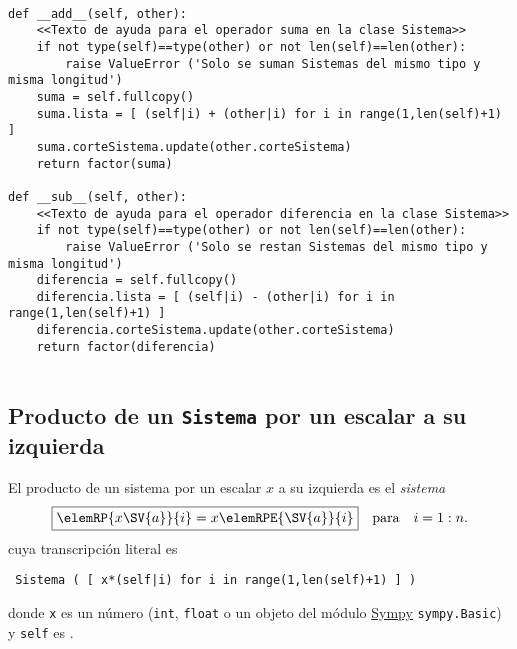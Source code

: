 \documentclass[11pt]{report}
\begin{document}
\begin{verbatim}

def __add__(self, other):
    <<Texto de ayuda para el operador suma en la clase Sistema>>
    if not type(self)==type(other) or not len(self)==len(other):
        raise ValueError ('Solo se suman Sistemas del mismo tipo y misma longitud')
    suma = self.fullcopy()
    suma.lista = [ (self|i) + (other|i) for i in range(1,len(self)+1) ]
    suma.corteSistema.update(other.corteSistema)
    return factor(suma)
            
def __sub__(self, other):
    <<Texto de ayuda para el operador diferencia en la clase Sistema>>
    if not type(self)==type(other) or not len(self)==len(other):
        raise ValueError ('Solo se restan Sistemas del mismo tipo y misma longitud')
    diferencia = self.fullcopy()
    diferencia.lista = [ (self|i) - (other|i) for i in range(1,len(self)+1) ]
    diferencia.corteSistema.update(other.corteSistema)
    return factor(diferencia)
            
\end{verbatim}

\subsection{Producto de un \texttt{Sistema} por un escalar a su izquierda}
\label{sec:orge535f1d}

El producto de un sistema  por un escalar \(x\) a su izquierda es
el \emph{sistema}
\begin{displaymath}
  \fbox{\begin{math} 
      \elemRP{x\SV{a}}{i}=x \elemRPE{\SV{a}}{i}
  \end{math}}\quad\text{para}\quad i=1:n.
\end{displaymath}
cuya transcripción literal es
\begin{center}
  \Verb/ Sistema ( [ x*(self|i) for i in range(1,len(self)+1) ] ) /
\end{center}

donde \texttt{x} es un número (\texttt{int}, \texttt{float} o un objeto del módulo \href{https://docs.sympy.org/latest/index.html}{Sympy}
\texttt{sympy.Basic}) y \texttt{self} es .
\end{document}
